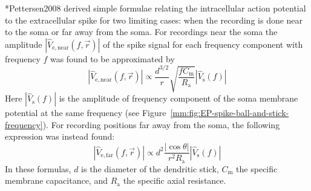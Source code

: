 \citeasnoun**{Pettersen2008} derived simple formulae relating the intracellular action potential to the extracellular spike for two limiting cases:
when the recording is done near to the soma or far away from the soma. For recordings near the soma the 
amplitude $|\hat{V}_\mathrm{e,near}(f,\vec{r})|$ of the spike signal for each frequency component with frequency $f$ was found to be approximated
by
%
\begin{equation}
  |\hat{V}_\mathrm{e,near}(f,\vec{r})| 
  \propto \frac{d^{3/2}}{r} \sqrt{ \frac{f C_\mathrm{m}}{R_\mathrm{a}} }  |\hat{V}_\mathrm{s}(f)| 
  \label{mm:equation:Ve_near}
\end{equation}
%
Here $|\hat{V}_\mathrm{s}(f)|$ is the amplitude of frequency component of the soma membrane potential at the same
frequency (see Figure~\ref{mm:fig:EP-spike-ball-and-stick-frequency}).
For recording positions far away from the soma, the following expression was instead found:
\begin{equation}
  |\hat{V}_\mathrm{e,far}(f,\vec{r})|  \propto d^{2} \frac{|\cos \theta| }{r^2  R_\mathrm{a}}  |\hat{V}_\mathrm{s}(f)| 
  \label{mm:equation:Ve_far}
\end{equation}
In these formulas, $d$ is the diameter of the dendritic
stick, $C_\mathrm{m}$ the specific membrane capacitance, and $R_\mathrm{a}$ the specific axial resistance.  




